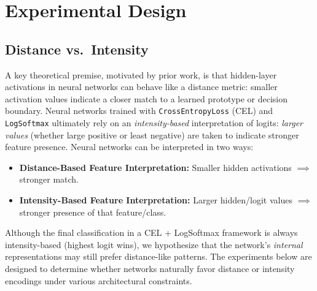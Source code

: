 \section{Experimental Design}
\label{sec:exp_design}

\subsection{Distance vs.\ Intensity}
\label{sec:distance_vs_intensity}
A key theoretical premise, motivated by prior work, is that hidden-layer activations in neural networks can behave like a distance metric: smaller activation values indicate a closer match to a learned prototype or decision boundary. Neural networks trained with \texttt{CrossEntropyLoss} (CEL) and \texttt{LogSoftmax} ultimately rely on an \emph{intensity-based} interpretation of logits: \emph{larger values} (whether large positive or least negative) are taken to indicate stronger feature presence.  Neural networks can be interpreted in two ways:

\begin{itemize}
    \item \textbf{Distance-Based Feature Interpretation:} Smaller hidden activations $\implies$ stronger match.
    \item \textbf{Intensity-Based Feature Interpretation:} Larger hidden/logit values $\implies$ stronger presence of that feature/class.
\end{itemize}

Although the final classification in a CEL + LogSoftmax framework is always intensity-based (highest logit wins), we hypothesize that the network's \emph{internal} representations may still prefer distance-like patterns. The experiments below are designed to determine whether networks naturally favor distance or intensity encodings under various architectural constraints.

